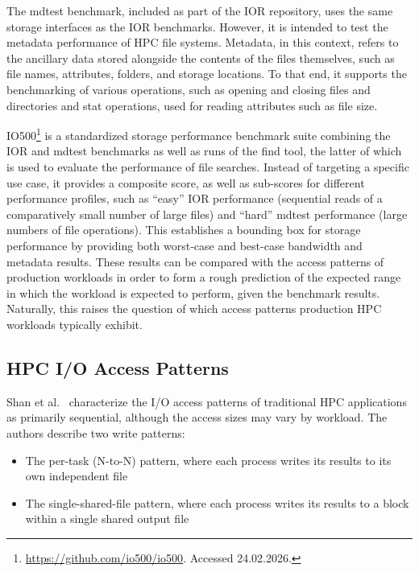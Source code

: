 The mdtest benchmark, included as part of the \ac{IOR} repository, uses the same storage interfaces as the \ac{IOR} benchmarks. However, it is intended to test the metadata performance of \ac{HPC} file systems. Metadata, in this context, refers to the ancillary data stored alongside the contents of the files themselves, such as file names, attributes, folders, and storage locations. To that end, it supports the benchmarking of various operations, such as opening and closing files and directories and stat operations, used for reading attributes such as file size.

IO500\footnote{\url{https://github.com/io500/io500}. Accessed 24.02.2026.} is a standardized storage performance benchmark suite combining the \ac{IOR}
and mdtest benchmarks as well as runs of the find tool, the latter of which is
used to evaluate the performance of file searches. Instead of targeting a
specific use case, it provides a composite score, as well as sub-scores for
different performance profiles, such as ``easy'' \ac{IOR} performance (sequential
reads of a comparatively small number of large files) and ``hard'' mdtest
performance (large numbers of file operations). This establishes a bounding box
for storage performance by providing both worst-case and best-case bandwidth and
metadata results. These results can be compared with the access patterns of
production workloads in order to form a rough prediction of the expected range
in which the workload is expected to perform, given the benchmark results.
Naturally, this raises the question of which access patterns production
\ac{HPC} workloads typically exhibit.

\subsection{\acs{HPC} \acs{I/O} Access Patterns}
\label{sec:access-patterns}

Shan et al.~\cite{hpc-io-prediction} characterize the \ac{I/O} access patterns of traditional \ac{HPC} applications as primarily sequential, although the access sizes may vary by workload. The authors describe two write patterns:

\begin{itemize}
    \item The per-task (N-to-N) pattern, where each process writes its results to its own independent file
    \item The single-shared-file pattern, where each process writes its results to a block within a single shared output file
\end{itemize}

